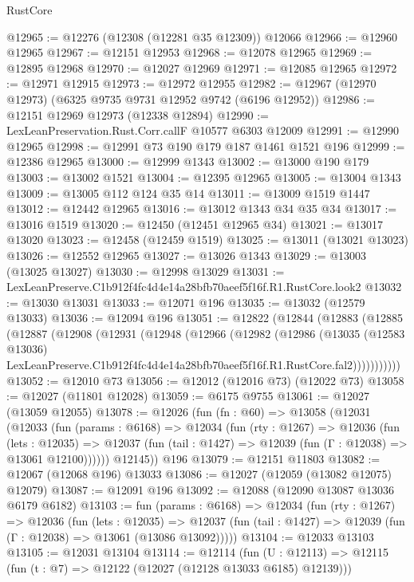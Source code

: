 \begin{lexlean}{RustCore}
\begin{coremodule}
@12965 := @12276 (@12308 (@12281 @35 @12309)) @12066
@12966 := @12960 @12965
@12967 := @12151 @12953
@12968 := @12078 @12965
@12969 := @12895 @12968
@12970 := @12027 @12969
@12971 := @12085 @12965
@12972 := @12971 @12915
@12973 := @12972 @12955
@12982 := @12967 (@12970 @12973) (@6325 @9735 @9731 @12952 @9742 (@6196 @12952))
@12986 := @12151 @12969 @12973 (@12338 @12894)
@12990 := LexLeanPreservation.Rust.Corr.callF @10577 @6303 @12009
@12991 := @12990 @12965
@12998 := @12991 @73 @190 @179 @187 @1461 @1521 @196
@12999 := @12386 @12965
@13000 := @12999 @1343
@13002 := @13000 @190 @179
@13003 := @13002 @1521
@13004 := @12395 @12965
@13005 := @13004 @1343
@13009 := @13005 @112 @124 @35 @14
@13011 := @13009 @1519 @1447
@13012 := @12442 @12965
@13016 := @13012 @1343 @34 @35 @34
@13017 := @13016 @1519
@13020 := @12450 (@12451 @12965 @34)
@13021 := @13017 @13020
@13023 := @12458 (@12459 @1519)
@13025 := @13011 (@13021 @13023)
@13026 := @12552 @12965
@13027 := @13026 @1343
@13029 := @13003 (@13025 @13027)
@13030 := @12998 @13029
@13031 := LexLeanPreserve.C1b912f4fc4d4e14a28bfb70aeef5f16f.R1.RustCore.look2
@13032 := @13030 @13031
@13033 := @12071 @196
@13035 := @13032 (@12579 @13033)
@13036 := @12094 @196
@13051 := @12822
    (@12844
      (@12883
        (@12885
          (@12887
            (@12908
              (@12931
                (@12948
                  (@12966
                    (@12982
                      (@12986
                        (@13035
                          (@12583 @13036)
                          LexLeanPreserve.C1b912f4fc4d4e14a28bfb70aeef5f16f.R1.RustCore.fal2)))))))))))
@13052 := @12010 @73
@13056 := @12012 (@12016 @73) (@12022 @73)
@13058 := @12027 (@11801 @12028)
@13059 := @6175 @9755
@13061 := @12027 (@13059 @12055)
@13078 := @12026
    (fun (fn : @60) =>
    @13058
      (@12031
        (@12033
          (fun (params : @6168) =>
          @12034
            (fun (rty : @1267) =>
            @12036
              (fun (lets : @12035) =>
              @12037 (fun (tail : @1427) => @12039 (fun (Γ : @12038) => @13061 @12100))))))
        @12145))
    @196
@13079 := @12151 @11803
@13082 := @12067 (@12068 @196) @13033
@13086 := @12027 (@12059 (@13082 @12075) @12079)
@13087 := @12091 @196
@13092 := @12088 (@12090 @13087 @13036 @6179 @6182)
@13103 := fun (params : @6168) =>
  @12034
    (fun (rty : @1267) =>
    @12036
      (fun (lets : @12035) =>
      @12037 (fun (tail : @1427) => @12039 (fun (Γ : @12038) => @13061 (@13086 @13092)))))
@13104 := @12033 @13103
@13105 := @12031 @13104
@13114 := @12114
    (fun (U : @12113) => @12115 (fun (t : @7) => @12122 (@12027 (@12128 @13033 @6185) @12139)))

\end{coremodule}
\end{lexlean}
